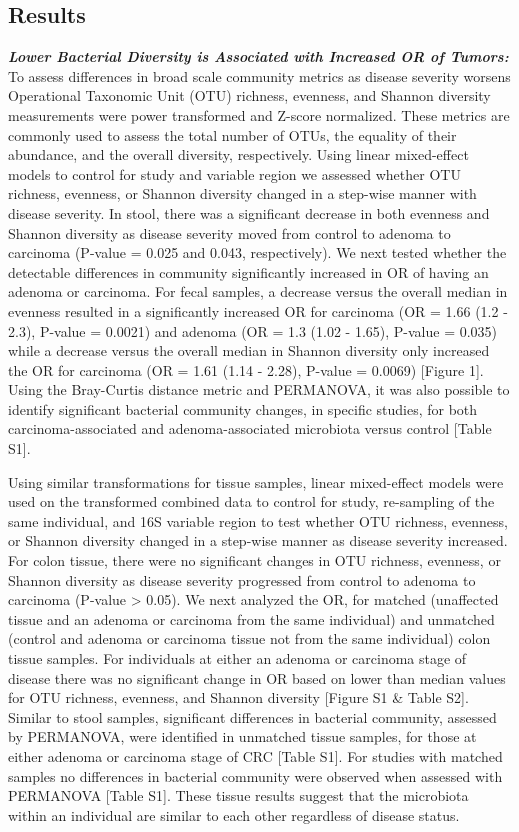 \documentclass[12pt,]{article}
\begin{document}
\newpage

\subsection{Results}\label{results}

\textbf{\emph{Lower Bacterial Diversity is Associated with Increased OR
of Tumors:}} To assess differences in broad scale community metrics as
disease severity worsens Operational Taxonomic Unit (OTU) richness,
evenness, and Shannon diversity measurements were power transformed and
Z-score normalized. These metrics are commonly used to assess the total
number of OTUs, the equality of their abundance, and the overall
diversity, respectively. Using linear mixed-effect models to control for
study and variable region we assessed whether OTU richness, evenness, or
Shannon diversity changed in a step-wise manner with disease severity.
In stool, there was a significant decrease in both evenness and Shannon
diversity as disease severity moved from control to adenoma to carcinoma
(P-value = 0.025 and 0.043, respectively). We next tested whether the
detectable differences in community significantly increased in OR of
having an adenoma or carcinoma. For fecal samples, a decrease versus the
overall median in evenness resulted in a significantly increased OR for
carcinoma (OR = 1.66 (1.2 - 2.3), P-value = 0.0021) and adenoma (OR =
1.3 (1.02 - 1.65), P-value = 0.035) while a decrease versus the overall
median in Shannon diversity only increased the OR for carcinoma (OR =
1.61 (1.14 - 2.28), P-value = 0.0069) {[}Figure 1{]}. Using the
Bray-Curtis distance metric and PERMANOVA, it was also possible to
identify significant bacterial community changes, in specific studies,
for both carcinoma-associated and adenoma-associated microbiota versus
control {[}Table S1{]}.

Using similar transformations for tissue samples, linear mixed-effect
models were used on the transformed combined data to control for study,
re-sampling of the same individual, and 16S variable region to test
whether OTU richness, evenness, or Shannon diversity changed in a
step-wise manner as disease severity increased. For colon tissue, there
were no significant changes in OTU richness, evenness, or Shannon
diversity as disease severity progressed from control to adenoma to
carcinoma (P-value \textgreater{} 0.05). We next analyzed the OR, for
matched (unaffected tissue and an adenoma or carcinoma from the same
individual) and unmatched (control and adenoma or carcinoma tissue not
from the same individual) colon tissue samples. For individuals at
either an adenoma or carcinoma stage of disease there was no significant
change in OR based on lower than median values for OTU richness,
evenness, and Shannon diversity {[}Figure S1 \& Table S2{]}. Similar to
stool samples, significant differences in bacterial community, assessed
by PERMANOVA, were identified in unmatched tissue samples, for those at
either adenoma or carcinoma stage of CRC {[}Table S1{]}. For studies
with matched samples no differences in bacterial community were observed
when assessed with PERMANOVA {[}Table S1{]}. These tissue results
suggest that the microbiota within an individual are similar to each
other regardless of disease status.
\end{document}
